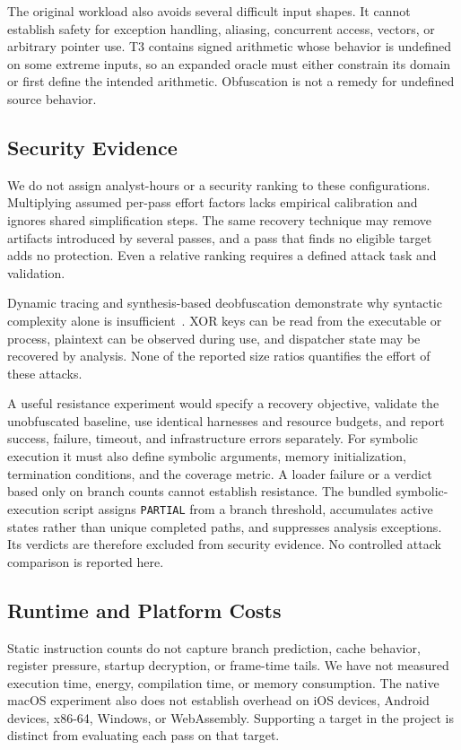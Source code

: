 \documentclass[conference]{IEEEtran}
\begin{document}
The original workload also avoids several difficult input shapes.
It cannot establish safety for exception handling, aliasing, concurrent
access, vectors, or arbitrary pointer use. T3 contains signed arithmetic
whose behavior is undefined on some extreme inputs, so an expanded
oracle must either constrain its domain or first define the intended
arithmetic. Obfuscation is not a remedy for undefined source behavior.

\subsection{Security Evidence}

We do not assign analyst-hours or a security ranking to these
configurations. Multiplying assumed per-pass effort factors lacks
empirical calibration and ignores shared simplification steps. The
same recovery technique may remove artifacts introduced by several
passes, and a pass that finds no eligible target adds no protection.
Even a relative ranking requires a defined attack task and validation.

Dynamic tracing and synthesis-based deobfuscation demonstrate why
syntactic complexity alone is insufficient~\cite{yadegari2015generic,
blazytko2017syntia}. XOR keys can be read from the executable or process,
plaintext can be observed during use, and dispatcher state may be
recovered by analysis. None of the reported size ratios quantifies the
effort of these attacks.

A useful resistance experiment would specify a recovery objective,
validate the unobfuscated baseline, use identical harnesses and resource
budgets, and report success, failure, timeout, and infrastructure errors
separately. For symbolic execution it must also define symbolic
arguments, memory initialization, termination conditions, and the
coverage metric. A loader failure or a verdict based only on branch counts cannot establish
resistance. The bundled symbolic-execution script assigns \texttt{PARTIAL}
from a branch threshold, accumulates active states rather than unique
completed paths, and suppresses analysis exceptions. Its verdicts are
therefore excluded from security evidence. No controlled attack comparison
is reported here.

\subsection{Runtime and Platform Costs}

Static instruction counts do not capture branch prediction, cache
behavior, register pressure, startup decryption, or frame-time tails.
We have not measured execution time, energy, compilation time, or
memory consumption. The native macOS experiment also does not establish
overhead on iOS devices, Android devices, x86-64, Windows, or WebAssembly.
Supporting a target in the project is distinct from evaluating each
pass on that target.
\end{document}
